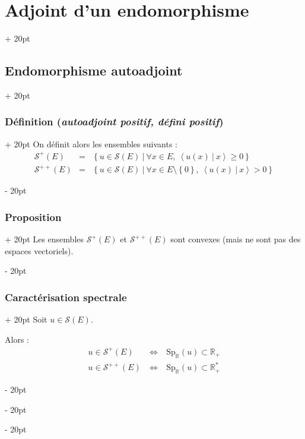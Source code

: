 \documentclass[a4paper, 12pt, twoside]{article}
\newcommand{\R}{\mathbb{R}} %
\newcommand{\set}[1]{\left\{ #1 \right\}}
\newcommand{\lrangle}[1]{\left\langle #1 \right\rangle}
\newcommand{\ssi}{\ \Leftrightarrow \ }
\renewcommand{\ge}{\geqslant}
\newcommand{\ps}[2]{\lrangle{#1\ |\ #2}}
\newcommand{\ind}[1][20pt]{\advance\leftskip + #1}
\newcommand{\deind}[1][20pt]{\advance\leftskip - #1}
\newenvironment{indt}[2][20pt]{#2 \par \ind[#1]}{\par \deind} %
\begin{document}
\begin{indt}{\section{Adjoint d'un endomorphisme}}
\begin{indt}{\subsection{Endomorphisme autoadjoint}}
\begin{indt}{\subsubsection{Définition (\textit{autoadjoint positif, défini positif})}}
                On définit alors les ensembles suivants :
                \[
                    \begin{array}{rcl}
                        \mathscr S^+(E)
                        &=& \set{u \in \mathscr S(E)\ |\ \forall x \in E,\ \ps{u(x)} x \ge 0}
                        \\
                        \mathscr S^{++}(E)
                        &=& \set{u \in \mathscr S(E)\ |\ \forall x \in E \setminus \set 0,\ \ps{u(x)} x > 0}
                    \end{array}
                \]
            \end{indt}

            \vspace{12pt}
            
            \begin{indt}{\subsubsection{Proposition}}
                Les ensembles $\mathscr S^+(E)$ et $\mathscr S^{++}(E)$ sont convexes (mais ne sont pas des espaces vectoriels).
            \end{indt}

            \vspace{12pt}
            
            \begin{indt}{\subsubsection{Caractérisation spectrale}}
                Soit $u \in \mathscr S(E)$.

                Alors :
                \[
                    \begin{array}{rcl}
                        u \in \mathscr S^+(E)
                        &\ssi&
                        \mathrm{Sp}_\R(u) \subset \R_+
                        \\
                        u \in \mathscr S^{++}(E)
                        &\ssi&
                        \mathrm{Sp}_\R(u) \subset \R_+^*
                    \end{array}
                \]
            \end{indt}
        \end{indt}
    \end{indt}

    \vspace{12pt}
    
\end{document}
